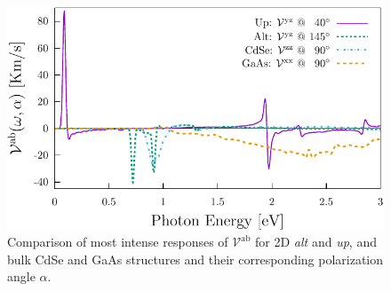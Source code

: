 \documentclass[prb,11pt,tightenlines,twocolumn,aps]{revtex4-1}
\begin{document}
\begin{figure}[t]
    \centering
    \includegraphics[width=\linewidth]{plots/vab-str-comp}
    
    \caption{Comparison of most intense responses of
    $\mathcal{V}^{\mathrm{ab}}$ for 2D \emph{alt} and \emph{up}, and bulk CdSe
    and GaAs structures and their corresponding polarization angle $\alpha$.}
    \label{fig:vab-str-comp}
\end{figure}
\end{document}
